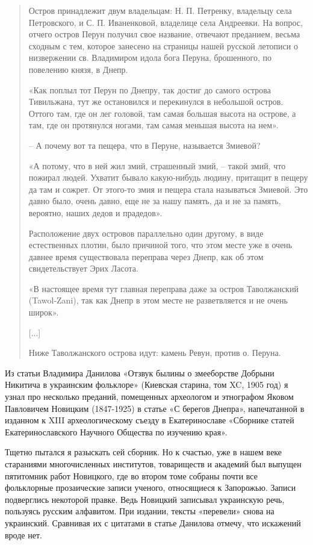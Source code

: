 \begin{quotation}
Остров принадлежит двум владельцам: Н.\- П. Петренку, владельцу села Петровского, и С. П. Иваненковой, владелице села Андреевки. На вопрос, отчего остров Перун получил свое название, отвечают преданием, весьма сходным с тем, которое занесено на страницы нашей русской летописи о низвержении св. Владимиром идола бога Перуна, брошенного, по повелению князя, в Днепр.

«Как поплыл тот Перун по Днепру, так достиг до самого острова Тивильжана, тут же остановился и перекинулся в небольшой остров. Оттого там, где он лег головой, там самая большая высота на острове, а там, где он протянулся ногами, там самая меньшая высота на нем».

 – А почему вот та пещера, что в Перуне, называется Змиевой?

«А потому, что в ней жил змий, страшенный змий, – такой змий, что пожирал людей. Ухватит бывало какую-нибудь людину, притащит в пещеру да там и сожрет. От этого-то змия и пещера стала называться Змиевой. Это давно было, очень давно, еще не за нашу память, да и не за память, вероятно, наших дедов и прадедов».

Расположение двух островов параллельно один другому, в виде естественных плотин, было причиной того, что этом месте уже в очень давнее время существовала переправа через Днепр, как об этом свидетельствует Эрих Ласота.

«В настоящее время тут главная переправа даже за остров Таволжанский (Tawol-Zani), так как Днепр в этом месте не разветвляется и не очень широк»\cite[стр. 29]{lasota}.

[...]

Ниже Таволжанского острова идут: камень Ревун, против о. Перуна.
\end{quotation}

Из статьи Владимира Данилова «Отзвук былины о змееборстве Добрыни Никитича в украинским фольклоре» (Киевская старина, том XC, 1905 год) я узнал про несколько преданий, помещенных археологом и этнографом Яковом Павловичем Новицким (1847-1925) в статье «С берегов Днепра», напечатанной в изданном к XIII археологическому съезду в Екатеринославе «Сборнике статей Екатеринославского Научного Общества по изучению края». 

Тщетно пытался я разыскать сей сборник. Но к счастью, уже в нашем веке стараниями многочисленных институтов, товариществ и академий был выпущен пятитомник работ Новицкого\cite{novickiy01}, где во втором томе собраны почти все фольклорные прозаические записи ученого, относящиеся к Запорожью. Записи подверглись некоторой правке. Ведь Новицкий записывал украинскую речь, пользуясь русским алфавитом. При издании, тексты «перевели» снова на украинский. Сравнивая их с цитатами в статье Данилова отмечу, что искажений вроде нет.

